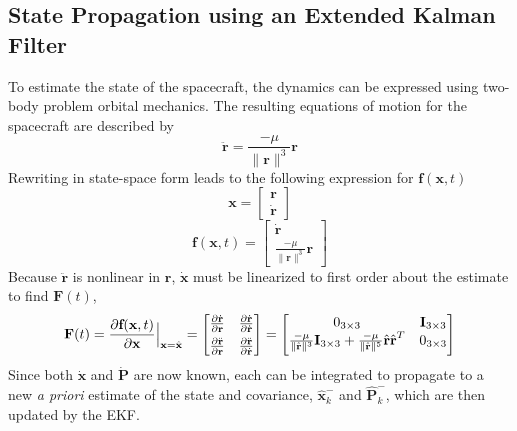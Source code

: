\documentclass[]{aiaa-tc}%
\begin{document}
\subsection{State Propagation using an Extended Kalman Filter}
To estimate the state of the spacecraft, the dynamics can be expressed using two-body problem orbital mechanics.  The resulting equations of motion for the spacecraft are described by
%
\begin{equation} \label{eq:TwoBodyEq}
\ddot{\textbf{r}}=\frac{-\mu}{\|\textbf{r}\|^{3}}\textbf{r}
\end{equation}
%
Rewriting in state-space form leads to the following expression for $\textbf{f}(\textbf{x},t)$
%
\begin{equation} \label{eq:x}
\textbf{x}=
\left[\begin{matrix}
\textbf{r} \\
\dot{\textbf{r}}\end{matrix}\right]
\end{equation}
\quad \quad \quad
%
\begin{equation} \label{eq:TwoBodyEqMatrix}
\textbf{f}(\textbf{x},t)=
\left[\begin{matrix}
{\dot{\textbf{r}}} \\
\frac{-\mu}{{\|\textbf{r}\|^{3}}}\textbf{r}
\end{matrix}\right]
\end{equation}
%
Because $\ddot{\textbf{r}}$ is nonlinear in $\textbf{r}$, $\dot{\textbf{x}}$ must be linearized to first order about the estimate to find $\textbf{F}(t)$,
%
\begin{equation} \label{eq:Fmat}
\textbf{F}(t)=\frac{\partial{\textbf{f}(\textbf{x},t)}}{\partial{\textbf{x}}}\Big{|}_{\textbf{x}=\hat{\textbf{x}}}=
\left[\begin{matrix}
\frac{\partial{\dot{\textbf{r}}}}{\partial{\textbf{r}}} & \frac{\partial{\dot{\textbf{r}}}}{\partial{\dot{\textbf{r}}}} \\[0.4em]
\frac{\partial{\ddot{\textbf{r}}}}{\partial{\textbf{r}}} & \frac{\partial{\ddot{\textbf{r}}}}{\partial{\dot{\textbf{r}}}} \\
\end{matrix}\right]=
\left[\begin{matrix}
0_{3\times3} & \textbf{I}_{3\times3} \\
\frac{-\mu}{\|\hat{\textbf{r}}\|^3}\textbf{I}_{3\times3}+\frac{-\mu}{\|\hat{\textbf{r}}\|^5}\hat{\textbf{r}}\hat{\textbf{r}}^T & 0_{3\times3} \\[0.4em]
\end{matrix}\right]
\end{equation}
%
Since both $\dot{\textbf{x}}$ and $\dot{\textbf{P}}$ are now known, each can be integrated to propagate to a new \textit{a priori} estimate of the state and covariance, $\hat{\textbf{x}}_k^-$ and $\hat{\textbf{P}}_k^-$, which are then updated by the EKF.
\end{document}
